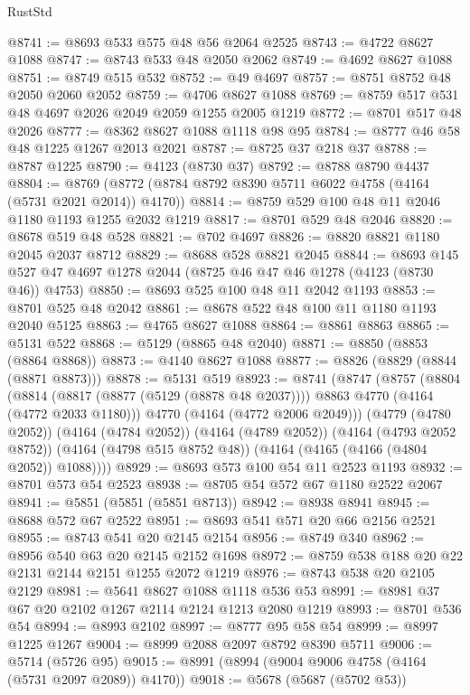 \begin{lexlean}{RustStd}
\begin{coremodule}
@8741 := @8693 @533 @575 @48 @56 @2064 @2525
@8743 := @4722 @8627 @1088
@8747 := @8743 @533 @48 @2050 @2062
@8749 := @4692 @8627 @1088
@8751 := @8749 @515 @532
@8752 := @49 @4697
@8757 := @8751 @8752 @48 @2050 @2060 @2052
@8759 := @4706 @8627 @1088
@8769 := @8759 @517 @531 @48 @4697 @2026 @2049 @2059 @1255 @2005 @1219
@8772 := @8701 @517 @48 @2026
@8777 := @8362 @8627 @1088 @1118 @98 @95
@8784 := @8777 @46 @58 @48 @1225 @1267 @2013 @2021
@8787 := @8725 @37 @218 @37
@8788 := @8787 @1225
@8790 := @4123 (@8730 @37)
@8792 := @8788 @8790 @4437
@8804 := @8769 (@8772 (@8784 @8792 @8390 @5711 @6022 @4758 (@4164 (@5731 @2021 @2014)) @4170))
@8814 := @8759 @529 @100 @48 @11 @2046 @1180 @1193 @1255 @2032 @1219
@8817 := @8701 @529 @48 @2046
@8820 := @8678 @519 @48 @528
@8821 := @702 @4697
@8826 := @8820 @8821 @1180 @2045 @2037 @8712
@8829 := @8688 @528 @8821 @2045
@8844 := @8693 @145 @527 @47 @4697 @1278 @2044 (@8725 @46 @47 @46 @1278 (@4123 (@8730 @46)) @4753)
@8850 := @8693 @525 @100 @48 @11 @2042 @1193
@8853 := @8701 @525 @48 @2042
@8861 := @8678 @522 @48 @100 @11 @1180 @1193 @2040 @5125
@8863 := @4765 @8627 @1088
@8864 := @8861 @8863
@8865 := @5131 @522
@8868 := @5129 (@8865 @48 @2040)
@8871 := @8850 (@8853 (@8864 @8868))
@8873 := @4140 @8627 @1088
@8877 := @8826 (@8829 (@8844 (@8871 @8873)))
@8878 := @5131 @519
@8923 := @8741
    (@8747
      (@8757
        (@8804
          (@8814 (@8817 (@8877 (@5129 (@8878 @48 @2037)))) @8863 @4770 (@4164 (@4772 @2033 @1180)))
          @4770
          (@4164 (@4772 @2006 @2049)))
        (@4779 (@4780 @2052))
        (@4164 (@4784 @2052))
        (@4164 (@4789 @2052))
        (@4164 (@4793 @2052 @8752))
        (@4164 (@4798 @515 @8752 @48))
        (@4164 (@4165 (@4166 (@4804 @2052)) @1088))))
@8929 := @8693 @573 @100 @54 @11 @2523 @1193
@8932 := @8701 @573 @54 @2523
@8938 := @8705 @54 @572 @67 @1180 @2522 @2067
@8941 := @5851 (@5851 (@5851 @8713))
@8942 := @8938 @8941
@8945 := @8688 @572 @67 @2522
@8951 := @8693 @541 @571 @20 @66 @2156 @2521
@8955 := @8743 @541 @20 @2145 @2154
@8956 := @8749 @340
@8962 := @8956 @540 @63 @20 @2145 @2152 @1698
@8972 := @8759 @538 @188 @20 @22 @2131 @2144 @2151 @1255 @2072 @1219
@8976 := @8743 @538 @20 @2105 @2129
@8981 := @5641 @8627 @1088 @1118 @536 @53
@8991 := @8981 @37 @67 @20 @2102 @1267 @2114 @2124 @1213 @2080 @1219
@8993 := @8701 @536 @54
@8994 := @8993 @2102
@8997 := @8777 @95 @58 @54
@8999 := @8997 @1225 @1267
@9004 := @8999 @2088 @2097 @8792 @8390 @5711
@9006 := @5714 (@5726 @95)
@9015 := @8991 (@8994 (@9004 @9006 @4758 (@4164 (@5731 @2097 @2089)) @4170))
@9018 := @5678 (@5687 (@5702 @53))

\end{coremodule}
\end{lexlean}
